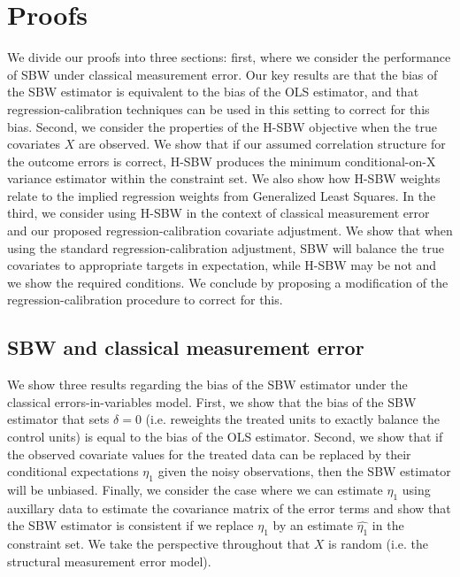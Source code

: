 \section{Proofs}\label{ssec:proof}

We divide our proofs into three sections: first, where we consider the performance of SBW under classical measurement error. Our key results are that the bias of the SBW estimator is equivalent to the bias of the OLS estimator, and that regression-calibration techniques can be used in this setting to correct for this bias. Second, we consider the properties of the H-SBW objective when the true covariates $X$ are observed. We show that if our assumed correlation structure for the outcome errors is correct, H-SBW produces the minimum conditional-on-X variance estimator within the constraint set. We also show how H-SBW weights relate to the implied regression weights from Generalized Least Squares. In the third, we consider using H-SBW in the context of classical measurement error and our proposed regression-calibration covariate adjustment. We show that when using the standard regression-calibration adjustment, SBW will balance the true covariates to appropriate targets in expectation, while H-SBW may be not and we show the required conditions. We conclude by proposing a modification of the regression-calibration procedure to correct for this.

\subsection{SBW and classical measurement error}\label{app:AsecI}

We show three results regarding the bias of the SBW estimator under the classical errors-in-variables model. First, we show that the bias of the SBW estimator that sets $\delta = 0$ (i.e. reweights the treated units to exactly balance the control units) is equal to the bias of the OLS estimator. Second, we show that if the observed covariate values for the treated data can be replaced by their conditional expectations $\eta_1$ given the noisy observations, then the SBW estimator will be unbiased. Finally, we consider the case where we can estimate $\eta_1$ using auxillary data to estimate the covariance matrix of the error terms and show that the SBW estimator is consistent if we replace $\eta_1$ by an estimate $\hat{\eta_1}$ in the constraint set. We take the perspective throughout that $X$ is random (i.e. the structural measurement error model).


